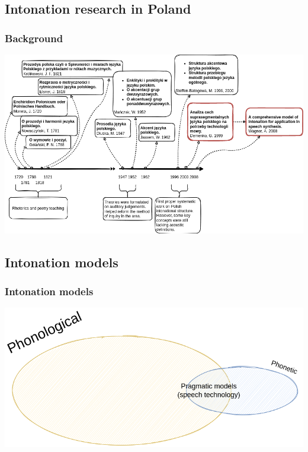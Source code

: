 \documentclass[a4paper,9pt]{beamer}
\theoremstyle{mytheoremstyle}
\begin{document}
\subsection{Intonation research in Poland}
\begin{frame}
\frametitle{Background}
\includegraphics[width=\textwidth]{res/intonation_background_pl.png}
\end{frame}

\subsection{Intonation models}
\begin{frame}
\frametitle{Intonation models}
\includegraphics[width=\textwidth]{res/inotnation_models_venn.png}
\end{frame}
\end{document}
